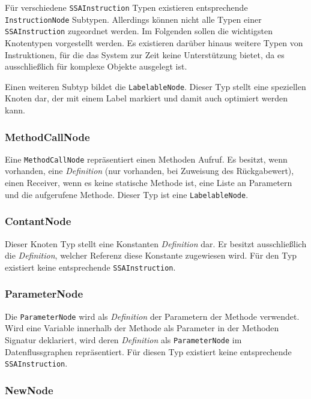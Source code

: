Für verschiedene \texttt{SSAInstruction} Typen existieren entsprechende 
\texttt{InstructionNode} Subtypen. Allerdings können nicht alle Typen 
einer \texttt{SSAInstruction} zugeordnet werden. Im Folgenden sollen die
wichtigsten Knotentypen vorgestellt werden. Es existieren darüber hinaus weitere
Typen von Instruktionen, für die das System zur Zeit keine Unterstützung bietet, 
da es ausschließlich für komplexe Objekte ausgelegt ist.

Einen weiteren Subtyp bildet die \texttt{LabelableNode}. Dieser Typ stellt eine
speziellen Knoten dar, der mit einem Label markiert und damit auch
optimiert werden kann. 

\subsubsection{MethodCallNode}

Eine \texttt{MethodCallNode} repräsentiert einen Methoden Aufruf. Es besitzt, wenn
vorhanden, eine \textit{Definition} (nur vorhanden, bei Zuweisung des Rückgabewert), einen Receiver, 
wenn es keine statische Methode ist, eine Liste an Parametern und die aufgerufene Methode. 
Dieser Typ ist eine \texttt{LabelableNode}.

\subsubsection{ContantNode}

Dieser Knoten Typ stellt eine Konstanten \textit{Definition} dar. Er besitzt ausschließlich 
die \textit{Definition}, welcher Referenz diese Konstante zugewiesen wird. Für den Typ
existiert keine entsprechende \texttt{SSAInstruction}.

\subsubsection{ParameterNode}

Die \texttt{ParameterNode} wird als \textit{Definition} der Parametern der Methode verwendet.
Wird eine Variable innerhalb der Methode als Parameter in der Methoden Signatur
deklariert, wird deren \textit{Definition} als \texttt{ParameterNode} im Datenflussgraphen
repräsentiert. Für diesen Typ existiert keine entsprechende \texttt{SSAInstruction}.

\subsubsection{NewNode}


